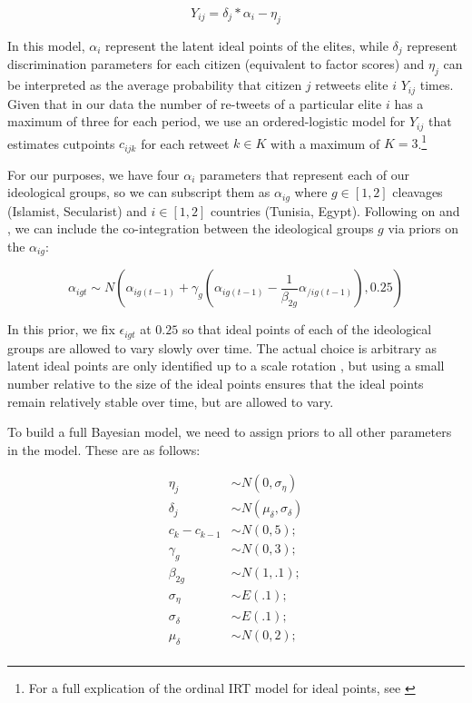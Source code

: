 \documentclass[12pt]{article}
\begin{document}
\begin{equation}
Y_{ij} = \delta_j * \alpha_i - \eta_j
\end{equation}

In this model, $\alpha_i$ represent the latent ideal points of the elites, while $\delta_j$ represent discrimination parameters for each citizen (equivalent to factor scores) and $\eta_j$ can be interpreted as the average probability that citizen $j$ retweets elite $i$ $Y_{ij}$ times. Given that in our data the number of re-tweets of a particular elite $i$ has a maximum of three for each period, we use an ordered-logistic model for $Y_{ij}$ that estimates cutpoints $c_{ijk}$ for each retweet $k \in K$ with a maximum of $K=3$.\footnote{For a full explication of the ordinal IRT model for ideal points, see \parencite{kubinec2017}}

For our purposes, we have four $\alpha_i$ parameters that represent each of our ideological groups, so we can subscript them as $\alpha_{ig}$ where $g \in [1,2]$ cleavages (Islamist, Secularist) and $i \in [1,2]$ countries (Tunisia, Egypt).  Following on \textcite{quinn2002} and \textcite{kropko2013}, we can include the co-integration between the ideological groups $g$ via priors on the $\alpha_{ig}$:

\begin{equation*}
\alpha_{igt}  \sim N(\alpha_{ig(t-1)} + \gamma_g (\alpha_{ig(t-1)} - \frac{1}{\beta_{2g}}  \alpha_{/ig(t-1)}),0.25)
\end{equation*}

In this prior, we fix $\epsilon_{igt}$ at $0.25$ so that ideal points of each of the ideological groups are allowed to vary slowly over time. The actual choice is arbitrary as latent ideal points are only identified up to a scale rotation \parencite{gelman2005}, but using a small number relative to the size of the ideal points ensures that the ideal points remain relatively stable over time, but are allowed to vary.

To build a full Bayesian model, we need to assign priors to all other parameters in the model. These are as follows:

\begin{align*}
	\eta_j &\sim N(0,\sigma_{\eta})\\
	\delta_j &\sim N(\mu_{\delta},\sigma_{\delta}) \\
	c_{k} - c_{k-1} &\sim N(0,5);\\
	\gamma_g &\sim N(0,3);\\
	\beta_{2g} &\sim  N(1,.1);\\
	\sigma_{\eta} &\sim E(.1);\\
	\sigma_{\delta} &\sim E(.1);\\
	\mu_{\delta} &\sim N(0,2);\\
\end{align*}
\end{document}
